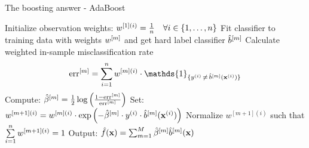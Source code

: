 \documentclass[11pt,compress,t,notes=noshow, xcolor=table]{beamer}
\begin{document}
\begin{vbframe}{The boosting answer - AdaBoost}
% 


\framebreak

\begin{algorithm}[H]
  \begin{algorithmic}[1]
    \State Initialize observation weights: $w^{[1](i)} = \frac{1}{n} \quad \forall i \in \{1, \ldots, n\}$
      \State Fit classifier to training data with weights $w^{[m]}$ and get hard label classifier $\hat{b}^{[m]}$
      \State Calculate weighted in-sample misclassification rate \vspace*{-1ex}
      $$\errm = \sumin \wmi \cdot \mathds{1}_{\{\yi \,\neq\, \blh(\xi)\}}$$\vspace*{-1ex}
      \State Compute: $ \hat{\beta}^{[m]} = \frac{1}{2} \log \left( \frac{1 - \text{err}^{[m]}}{\text{err}^{[m]}}\right)$
      \State Set: $w^{[m+1](i)} = w^{[m](i)} \cdot \exp\left(- \hat{\beta}^{[m]} \cdot
        y^{(i)} \cdot \hat{b}^{[m]}(\mathbf{x}^{(i)})\right) $
      \State Normalize $w^{[m+1](i)}$ such that $\sum\limits_{i=1}^n w^{[m+1](i)} = 1$
    \EndFor
    \State Output: $\hat{f}(\mathbf{x}) = \sum_{m=1}^{M} \hat{\beta}^{[m]} \hat{b}^{[m]}(\mathbf{x})$
  \end{algorithmic}
  \caption{AdaBoost}
\end{algorithm}

\end{vbframe}

\end{document}
